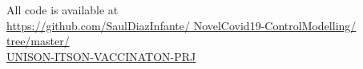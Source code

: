         All code is available at
    \\
    \noindent
    \href{https://github.com/%
        SaulDiazInfante/%
        NovelCovid19-ControlModelling/%
        tree/master/%
        UNISON-ITSON-VACCINATON-PRJ}{%
        https://github.com/SaulDiazInfante/
        NovelCovid19-ControlModelling/
        tree/master/%
        \\
        UNISON-ITSON-VACCINATON-PRJ}
